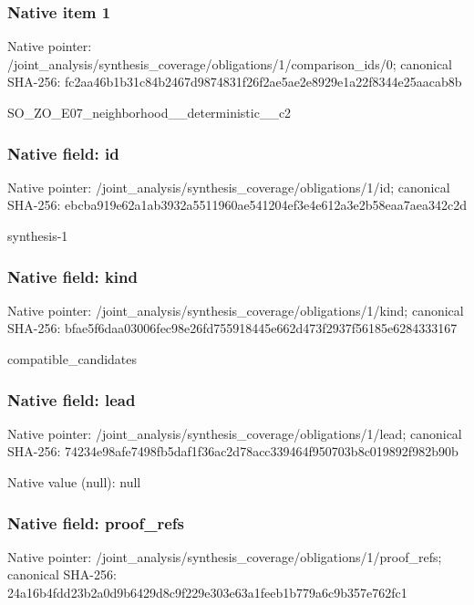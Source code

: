 \documentclass[10pt,a4paper]{article}
\begin{document}
\subsubsection{Native item 1}
Native pointer: /joint\_\allowbreak{}analysis/synthesis\_\allowbreak{}coverage/obligations/1/comparison\_\allowbreak{}ids/0; canonical SHA-256: fc2aa46b1b31c84b2467d9874831f26f2ae5ae2e8929e1a22f8344e25aacab8b

\begingroup\raggedright\sloppy SO\_\allowbreak{}ZO\_\allowbreak{}E07\_\allowbreak{}neighborhood\_\allowbreak{}\_\allowbreak{}deterministic\_\allowbreak{}\_\allowbreak{}c2\par\endgroup

\subsubsection{Native field: id}
Native pointer: /joint\_\allowbreak{}analysis/synthesis\_\allowbreak{}coverage/obligations/1/id; canonical SHA-256: ebcba919e62a1ab3932a5511960ae541204ef3e4e612a3e2b58eaa7aea342c2d

\begingroup\raggedright\sloppy synthesis-1\par\endgroup

\subsubsection{Native field: kind}
Native pointer: /joint\_\allowbreak{}analysis/synthesis\_\allowbreak{}coverage/obligations/1/kind; canonical SHA-256: bfae5f6daa03006fec98e26fd755918445e662d473f2937f56185e6284333167

\begingroup\raggedright\sloppy compatible\_\allowbreak{}candidates\par\endgroup

\subsubsection{Native field: lead}
Native pointer: /joint\_\allowbreak{}analysis/synthesis\_\allowbreak{}coverage/obligations/1/lead; canonical SHA-256: 74234e98afe7498fb5daf1f36ac2d78acc339464f950703b8c019892f982b90b

Native value (null): null

\subsubsection{Native field: proof\_\allowbreak{}refs}
Native pointer: /joint\_\allowbreak{}analysis/synthesis\_\allowbreak{}coverage/obligations/1/proof\_\allowbreak{}refs; canonical SHA-256: 24a16b4fdd23b2a0d9b6429d8c9f229e303e63a1feeb1b779a6c9b357e762fc1
\end{document}
